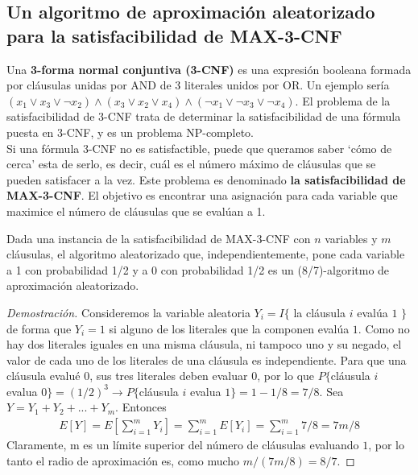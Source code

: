 \documentclass{article}
\begin{document}
\subsection{Un algoritmo de aproximación aleatorizado para la satisfacibilidad de MAX-3-CNF}
Una \textbf{3-forma normal conjuntiva (3-CNF)} es una expresión booleana formada por cláusulas unidas por AND de 3 literales unidos por OR. Un ejemplo sería $(x_1 \vee x_3 \vee \neg x_2) \wedge (x_3 \vee x_2 \vee x_4) \wedge(\neg x_1 \vee \neg x_3 \vee \neg x_4)$. El problema de la satisfacibilidad de 3-CNF trata de determinar la satisfacibilidad de una fórmula puesta en 3-CNF, y es un problema NP-completo.\\

Si una fórmula 3-CNF no es satisfactible, puede que queramos saber `cómo de cerca' esta de serlo, es decir, cuál es el número máximo de cláusulas que se pueden satisfacer a la vez. Este problema es denominado \textbf{la satisfacibilidad de MAX-3-CNF}. El objetivo es encontrar una asignación para cada variable que maximice el número de cláusulas que se evalúan a 1.

\begin{thr}
Dada una instancia de la satisfacibilidad de MAX-3-CNF con $n$ variables y $m$ cláusulas, el algoritmo aleatorizado que, independientemente, pone cada variable a 1 con probabilidad 1/2 y a 0 con probabilidad 1/2 es un (8/7)-algoritmo de aproximación aleatorizado.
\end{thr}
\begin{proof}[Demostración]
Consideremos la variable aleatoria $Y_{i} = I\{$ la cláusula $i$ evalúa $1$ $\}$ de forma que $Y_{i} = 1$ si alguno de los literales que la componen evalúa $1$. Como no hay dos literales iguales en una misma cláusula, ni tampoco uno y su negado, el valor de cada uno de los literales de una cláusula es independiente. Para que una cláusula evalué $0$, sus tres literales deben evaluar $0$, por lo que $P\{$cláusula $i$ evalua $0\} = (1/2)^{3} \rightarrow P\{$cláusula $i$ evalua $1\} = 1 - 1/8 = 7/8$. Sea $Y = Y_{1} + Y_{2} + ... + Y_{m}$. Entonces
\begin{gather*}
	E[Y] = E[\sum_{i=1}^{m}Y_{i}] = \sum_{i=1}^{m}E[Y_{i}] = \sum_{i=1}^{m}7/8 = 7m/8
\end{gather*}
Claramente, m es un límite superior del número de cláusulas evaluando $1$, por lo tanto el radio de aproximación es, como mucho $m/(7m/8) = 8/7$.

\end{proof}
\end{document}
